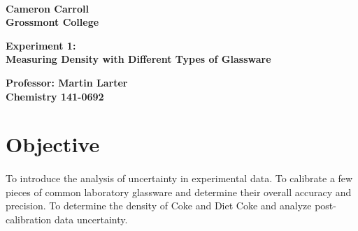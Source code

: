 \documentclass[fleqn,titlepage]{article}
\begin{document}
\begin{titlepage}
  \mbox{}\\[1.25cm]
  \textbf{\LARGE Cameron Carroll \\ Grossmont College}\\[2.25cm]
  \begin{center}
    \textbf{\huge Experiment 1: \\ Measuring Density with Different Types of Glassware}\\[2.50cm]
  \end{center}
  \textbf{\LARGE Professor: Martin Larter \\ Chemistry 141-0692} \\
  \vfill
\end{titlepage}

\section*{Objective}
  \paragraph{} To introduce the analysis of uncertainty in experimental data. To calibrate a few pieces of common laboratory glassware and determine their overall accuracy and precision. To determine the density of Coke and Diet Coke and analyze post-calibration data uncertainty.

\end{document}
